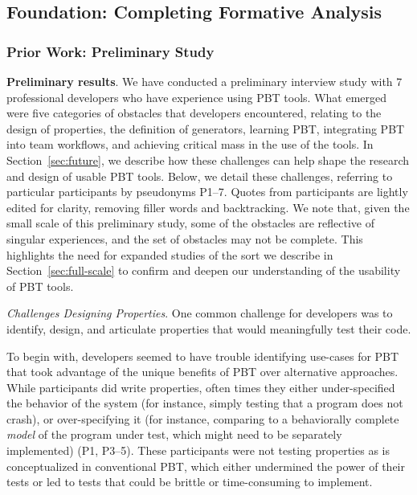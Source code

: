 \subsection{Foundation: Completing Formative Analysis }
\subsubsection{Prior Work: Preliminary Study}

\textbf{Preliminary results}.
We have conducted a preliminary interview study with 7 professional developers
who have experience using PBT tools.
What emerged were five categories of obstacles that developers encountered,
relating
to the design of properties, the definition of generators, learning PBT,
integrating PBT into team workflows, and achieving critical mass in the use of the tools.
In Section~\ref{sec:future}, we describe how these challenges
can help shape the research and design of usable PBT tools.
Below, we detail these challenges, referring to particular participants by
pseudonyms P1--7. Quotes from participants are lightly edited for clarity,
removing filler words and backtracking.
We note that, given the small scale of this preliminary study, some
of the obstacles are reflective of singular experiences, and the set of
obstacles may not be complete. This
highlights the need for expanded
studies of the sort we describe in Section~\ref{sec:full-scale} to confirm
and deepen our understanding of the usability of PBT tools.

\textit{Challenges Designing Properties}.
One common challenge for developers was to identify, design,
and articulate properties that would meaningfully test their code.

To begin with, developers seemed to have trouble identifying use-cases for PBT
that took advantage of the unique benefits of PBT over alternative approaches. While participants
did write properties, often times they either under-specified the
behavior of the system (for instance, simply testing that a program does not crash),
or over-specifying it (for instance, comparing to a behaviorally complete
{\em model} of the program under test, which might need to be separately
implemented) (P1, P3--5).
These participants were not testing properties as is conceptualized
in conventional PBT, which either undermined the power of their tests or
led to tests that could be brittle or time-consuming to implement.

